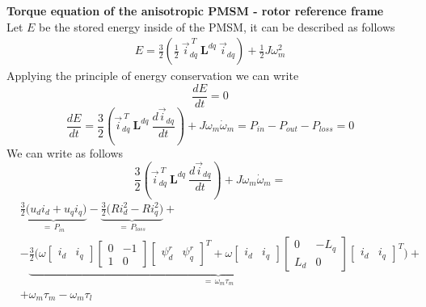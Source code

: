 \documentclass[11pt,a4paper]{article}
\numberwithin{equation}{section}
\theoremstyle{it}
\theoremstyle{definition}
\begin{document}
\begin{onehalfspace}
\textbf{Torque equation of the anisotropic PMSM - rotor reference frame}\\
Let $E$ be the stored energy inside of the PMSM, it can be described as follows
\begin{equation*}
	\begin{aligned}
		E = \frac{3}{2} \left(\frac{1}{2}\ \vec{i}_{dq}^{\ T}\ \mathbf{L}^{dq}\ \vec{i}_{dq}\right) +\frac{1}{2}J\omega_m^2
	\end{aligned} 
\end{equation*}
Applying the principle of energy conservation we can write
\begin{equation*}
	\frac{dE}{dt} = 0
\end{equation*}
\begin{equation*}
	\frac{dE}{dt} = \frac{3}{2} \left( \vec{i}_{dq}^{\ T}\ \mathbf{L}^{dq}\ \frac{d\vec{i}_{dq}}{dt}\right) + J\omega_m\dot{\omega}_m= P_{in}-P_{out}-P_{loss} = 0
\end{equation*}
We can write as follows
\begin{equation*}
	\frac{3}{2} \left( \vec{i}_{dq}^{\ T}\ \mathbf{L}^{dq}\ \frac{d\vec{i}_{dq}}{dt}\right) + J\omega_m\dot{\omega}_m =
\end{equation*}
\begin{equation*}
	\begin{aligned}
		&\underbrace{\frac{3}{2}\Big(u_d i_d+u_q i_q\Big)}_{=\,P_{in}}-\underbrace{\frac{3}{2}\Big(Ri_d^2-Ri_q^2\Big)}_{=\,P_{loss}} + \\[6pt]
		&-\underbrace{\frac{3}{2}\Big(\omega 
			\begin{bmatrix} i_d & i_q \end{bmatrix}
			\begin{bmatrix} 0 & -1 \\ 1 & 0\end{bmatrix}
			\begin{bmatrix} \psi^r_d & \psi^r_q \end{bmatrix}^T
			+\omega 
			\begin{bmatrix} i_d & i_q \end{bmatrix}
			\begin{bmatrix} 0 & -L_q \\ L_d & 0\end{bmatrix}
			\begin{bmatrix} i_d & i_q \end{bmatrix}^T\Big)
		}_{=\,\omega_m\tau_m} + \\[6pt]
		& +\omega_m\tau_m-\omega_m\tau_l
	\end{aligned}

\end{equation*}
\end{onehalfspace}
\end{document}
